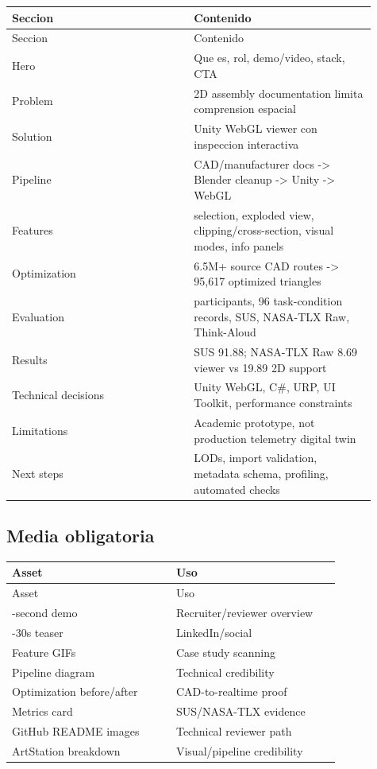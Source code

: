\begin{center}
\scriptsize
\begin{longtable}{>{\raggedright\arraybackslash}p{0.455\linewidth} >{\raggedright\arraybackslash}p{0.455\linewidth}}
\toprule
Seccion & Contenido \\
\midrule
\endfirsthead
\toprule
Seccion & Contenido \\
\midrule
\endhead
Hero & Que es, rol, demo/video, stack, CTA \\
Problem & 2D assembly documentation limita comprension espacial \\
Solution & Unity WebGL viewer con inspeccion interactiva \\
Pipeline & CAD/manufacturer docs -> Blender cleanup -> Unity -> WebGL \\
Features & selection, exploded view, clipping/cross-section, visual modes, info panels \\
Optimization & 6.5M+ source CAD routes -> 95,617 optimized triangles \\
Evaluation & 12 participants, 96 task-condition records, SUS, NASA-TLX Raw, Think-Aloud \\
Results & SUS 91.88; NASA-TLX Raw 8.69 viewer vs 19.89 2D support \\
Technical decisions & Unity WebGL, C\#, URP, UI Toolkit, performance constraints \\
Limitations & Academic prototype, not production telemetry digital twin \\
Next steps & LODs, import validation, metadata schema, profiling, automated checks \\
\bottomrule
\end{longtable}
\end{center}


\subsection{Media obligatoria}


\begin{center}
\scriptsize
\begin{longtable}{>{\raggedright\arraybackslash}p{0.455\linewidth} >{\raggedright\arraybackslash}p{0.455\linewidth}}
\toprule
Asset & Uso \\
\midrule
\endfirsthead
\toprule
Asset & Uso \\
\midrule
\endhead
90-second demo & Recruiter/reviewer overview \\
15-30s teaser & LinkedIn/social \\
Feature GIFs & Case study scanning \\
Pipeline diagram & Technical credibility \\
Optimization before/after & CAD-to-realtime proof \\
Metrics card & SUS/NASA-TLX evidence \\
GitHub README images & Technical reviewer path \\
ArtStation breakdown & Visual/pipeline credibility \\
\bottomrule
\end{longtable}
\end{center}


